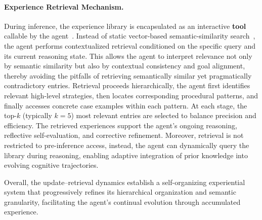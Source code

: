 \paragraph{Experience Retrieval Mechanism.}
During inference, the experience library is encapsulated as an interactive \textbf{tool} callable by the agent~\cite{yao2022react,qiu2025alita}.
Instead of static vector-based semantic-similarity search~\cite{reimers2019sentence,ram2023context,karpukhin2020dense}, the agent performs contextualized retrieval conditioned on the specific query and its current reasoning state. 
This allows the agent to interpret relevance not only by semantic similarity but also by contextual consistency and goal alignment, thereby avoiding the pitfalls of retrieving semantically similar yet pragmatically contradictory entries.
Retrieval proceeds hierarchically, the agent first identifies relevant high-level strategies, then locates corresponding procedural patterns, and finally accesses concrete case examples within each pattern. 
At each stage, the top-$k$ (typically $k=5$) most relevant entries are selected to balance precision and efficiency. 
The retrieved experiences support the agent’s ongoing reasoning, reflective self-evaluation, and corrective refinement.
Moreover, retrieval is not restricted to pre-inference access, instead, the agent can dynamically query the library during reasoning, enabling adaptive integration of prior knowledge into evolving cognitive trajectories.

Overall, the update–retrieval dynamics establish a self-organizing experiential system that progressively refines its hierarchical organization and semantic granularity, facilitating the agent’s continual evolution through accumulated experience.